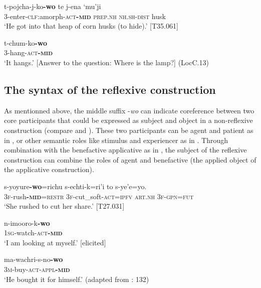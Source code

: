 \documentclass[output=paper]{langscibook}
\begin{document}
\ea
\label{ex:Rose:15}
\gll t-pojcha-j-ko\textbf{-wo} te j-ena `mu'ji\\
3-enter-\textsc{clf}:amorph-\textsc{act\textbf{-mid} prep.nh} \textsc{nh.sh-dist} husk\\
\glt ‘He got into that heap of corn husks (to hide).’ [T35.061]
\z

\ea
\label{ex:Rose:16}
\gll t-chum-ko\textbf{-wo} \\
3-hang-\textsc{act\textbf{-mid}}\\
\glt ‘It hangs.’ [Answer to the question: Where is the lamp?] (LocC.13)
\z

\subsection{The syntax of the reflexive construction}
\label{sec:Rose:3.3}

As mentionned above, the middle suffix -\textit{wo} can indicate coreference between two core participants that could be expressed as subject and object in a non-reflexive construction (compare  and ). These two participants can be agent and patient as in , or other semantic roles like stimulus and experiencer as in . Through combination with the benefactive applicative as in , the subject of the reflexive construction can combine the roles of agent and benefactive (the applied object of the applicative construction).


\ea
\label{ex:Rose:17}
\gll s-yoyure\textbf{-wo}=richu s-echti-k=ri'i to s-ye'e=yo.\\
3\textsc{f}-rush\textbf{-}\textsc{\textbf{mid}=restr} 3\textsc{f}-cut\_soft-\textsc{act=ipfv} \textsc{art.nh} \textsc{3f-gpn=fut}\\
\glt ‘She rushed to cut her share.’ [T27.031]
\z

\ea
\label{ex:Rose:18}
\gll n-imooro-k\textbf{-wo} \\
1\textsc{sg}-watch-\textsc{act\textbf{-mid}}\\
\glt ‘‎I am looking at myself.’ [elicited]
\z

\ea
\label{ex:Rose:19}
\gll ma-wachri-s-no\textbf{-wo}\\
3\textsc{m}-buy-\textsc{act-appl\textbf{-mid}}\\
\glt ‘He bought it for himself.’ (adapted from \citealt{Gill1957}: 132)
\z
\end{document}
